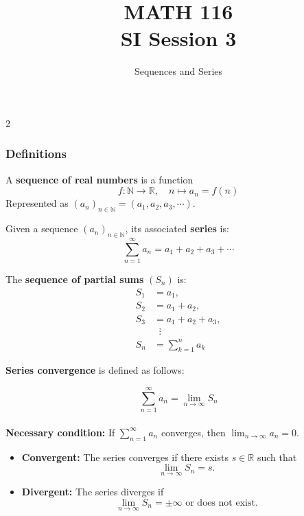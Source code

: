 \documentclass[12pt]{article}
\newcommand{\N}{\mathbb{N}}
\begin{document}

\title{MATH 116 \\ SI Session 3}
\author{Sequences and Series}
\date{} %

\maketitle

\begin{multicols}{2}
\subsubsection*{Definitions}

A \textbf{sequence of real numbers} is a function
\[ f: \N \to \mathbb{R},\quad n \mapsto a_n = f(n) \]
Represented as \((a_n)_{n \in \N} = (a_1, a_2, a_3, \cdots)\).

Given a sequence \((a_n)_{n \in \N}\), its associated \textbf{series} is:
\[ \sum_{n=1}^\infty a_n = a_1 + a_2 + a_3 + \cdots \]

The \textbf{sequence of partial sums} \((S_n)\) is:
\[
\begin{aligned}
S_1 &= a_1, \\
S_2 &= a_1 + a_2, \\
S_3 &= a_1 + a_2 + a_3, \\
&\;\;\vdots \\
S_n &= \sum_{k=1}^n a_k
\end{aligned}
\]

\textbf{Series convergence} is defined as follows:

\[
\sum_{n=1}^\infty a_n = \lim_{n \to \infty} S_n
\]
\\
\textbf{Necessary condition:} If $\sum_{n=1}^\infty a_n$ converges, then $\lim_{n\to\infty} a_n=0$.

\begin{itemize}
    \item \textbf{Convergent:} The series converges if there exists $s \in \mathbb{R}$ such that  
    \[
    \lim_{n \to \infty} S_n = s.
    \]
    \item \textbf{Divergent:} The series diverges if  
    \[
    \lim_{n \to \infty} S_n = \pm\infty \text{ or does not exist}.
    \]
\end{itemize}


\columnbreak


\end{multicols}
\end{document}
